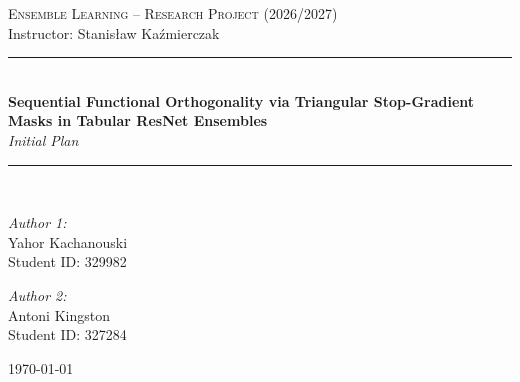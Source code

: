 \documentclass[11pt, a4paper]{article}
\begin{document}
\begin{titlepage}
    \centering
    \vspace*{2cm}
    
    {\Large \textsc{Ensemble Learning -- Research Project (2026/2027)}}\\[0.5cm]
    {\large Instructor: Stanisław Kaźmierczak}\\[3cm]
    
    \rule{\linewidth}{0.5mm} \\[0.4cm]
    {\huge \bfseries Sequential Functional Orthogonality via Triangular Stop-Gradient Masks in Tabular ResNet Ensembles \\[0.2cm] }
    {\Large \textit{Initial Plan}}
    \rule{\linewidth}{0.5mm} \\[2.5cm]
    
    \begin{minipage}{0.45\textwidth}
        \begin{flushleft} \large
            \emph{Author 1:}\\
            {Yahor Kachanouski}\\
            {\small Student ID: 329982}\\
        \end{flushleft}
    \end{minipage}
    \hfill
    \begin{minipage}{0.45\textwidth}
        \begin{flushright} \large
            \emph{Author 2:}\\
            {Antoni Kingston}\\
            {\small Student ID: 327284}\\
        \end{flushright}
    \end{minipage}
    
    \vfill
    
    {\large \today}
    
\end{titlepage}

\tableofcontents
\newpage

\end{document}
